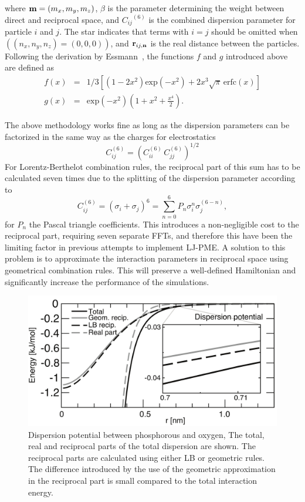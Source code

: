 where ${\bf m}=(m_x,m_y,m_z)$, $\beta$ is the parameter determining the weight between
direct and reciprocal space, and ${C_{ij}}^{(6)}$ is the combined dispersion
parameter for particle $i$ and $j$. The star indicates that terms
with $i = j$ should be omitted when $((n_x,n_y,n_z)=(0,0,0))$, and
${\bf r}_{ij,{\bf n}}$ is the real distance between the particles.
Following the derivation by Essmann~\cite{Essmann95}, the functions $f$ and $g$ introduced above are defined as
\begin{eqnarray}
f(x)&=&1/3\left[(1-2x^2){\mathrm{exp}}(-x^2) + 2{x^3}\sqrt{\pi}\,{\mathrm{erfc}}(x) \right] \\
g(x)&=&{\mathrm{exp}}(-x^2)(1+x^2+\frac{x^4}{2}).
\end{eqnarray}

The above methodology works fine as long as the dispersion parameters can be factorized in the same
way as the charges for electrostatics
\begin{equation}
C_{ij}^{(6)} = \left({C_{ii}^{(6)} \, C_{jj}^{(6)}}\right)^{1/2}
\end{equation}
For Lorentz-Berthelot combination rules, the reciprocal part of this sum has to be calculated
seven times due to the splitting of the dispersion parameter according to
\begin{equation}
C_{ij}^{(6)}=(\sigma_i+\sigma_j)^6=\sum_{n=0}^{6} P_{n}\sigma_{i}^{n}\sigma_{j}^{(6-n)},
\end{equation}
for $P_{n}$ the Pascal triangle coefficients. This introduces a
non-negligible cost to the reciprocal part, requiring seven separate
FFTs, and therefore this have been the limiting factor in previous
attempts to implement LJ-PME. A solution to this problem is to
approximate the interaction parameters in reciprocal space using
geometrical combination rules.  This will preserve a well-defined
Hamiltonian and significantly increase the performance of the
simulations.

\begin{figure}
\centerline{\includegraphics[width=15cm]{plots/ljpmedifference}}
\caption {Dispersion potential between phosphorous and oxygen, The total, real and
reciprocal parts of the total dispersion are shown. The reciprocal parts are calculated
using either LB or geometric rules. The difference introduced by the use of the
geometric approximation in the reciprocal part is small compared to the total
interaction energy.}
\label{fig:ljpmedifference}
\end{figure}

